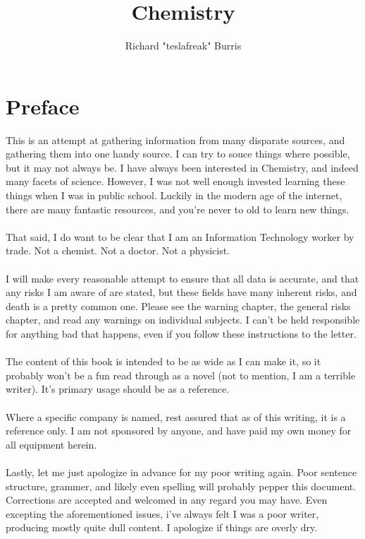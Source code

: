 \documentclass{book}
\author{Richard "teslafreak" Burris}
\title{Chemistry}
\begin{document}
\maketitle
\newpage
\tableofcontents
\newpage
\chapter{Preface}
This is an attempt at gathering information from many disparate sources, and gathering them into one handy source.  I can try to souce things where possible, but it may not always be.  I have always been interested in Chemistry, and indeed many facets of science.  However, I was not well enough invested learning these things when I was in public school.  Luckily in the modern age of the internet, there are many fantastic resources, and you're never to old to learn new things.\\
\\
That said, I do want to be clear that I am an Information Technology worker by trade.  Not a chemist.  Not a doctor.  Not a physicist.\\
\\
I will make every reasonable attempt to ensure that all data is accurate, and that any risks I am aware of are stated, but these fields have many inherent risks, and death is a pretty common one.  Please see the warning chapter, the general risks chapter, and read any warnings on individual subjects.  I can't be held responsible for anything bad that happens, even if you follow these instructions to the letter.\\
\\
The content of this book is intended to be as wide as I can make it, so it probably won't be a fun read through as a novel (not to mention, I am a terrible writer).  It's primary usage should be as a reference.\\
\\
Where a specific company is named, rest assured that as of this writing, it is a reference only.  I am not sponsored by anyone, and have paid my own money for all equipment herein.\\
\\
Lastly, let me just apologize in advance for my poor writing again.  Poor sentence structure, grammer, and likely even spelling will probably pepper this document.  Corrections are accepted and welcomed in any regard you may have.  Even excepting the aforementioned issues, i've always felt I was a poor writer, producing mostly quite dull content.  I apologize if things are overly dry.  
\end{document}

